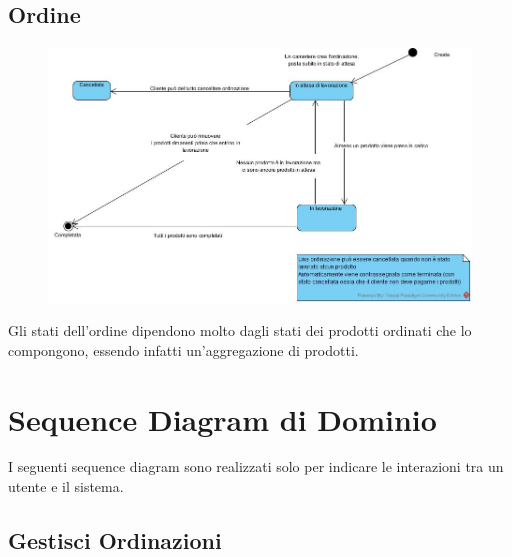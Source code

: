 \subsection{Ordine}
\vspace*{0.2cm}
\begin{figure}[H]
	\centering
	\includegraphics[width=1\textwidth]{Immagini/stati_ordinazione.jpg}
\end{figure}
\vspace*{0.1cm}
Gli stati dell'ordine dipendono molto dagli stati dei prodotti ordinati che lo compongono, essendo infatti un'aggregazione di prodotti.

\newpage
\section{Sequence Diagram di Dominio}
I seguenti sequence diagram sono realizzati solo per indicare le interazioni tra un utente e il sistema.

\subsection{Gestisci Ordinazioni}
